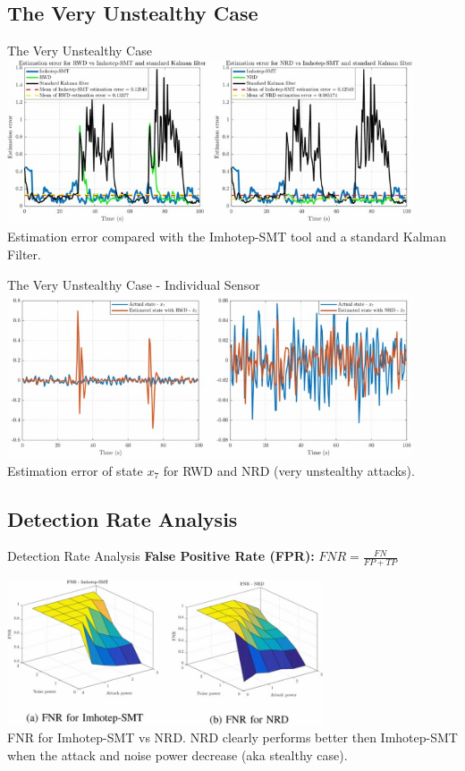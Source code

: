 \documentclass[aspectratio=169]{beamer}
\begin{document}
\subsection{The Very Unstealthy Case}
\begin{frame}{The Very Unstealthy Case}
	\centering
	\includegraphics[width=0.9\textwidth]{Images/Sim_Error_Comparison_VeryUnstealthy}\\
	Estimation error compared with the {Imhotep-SMT tool \cite{Imhotep_SMT}} and a standard Kalman Filter.
\end{frame}

\begin{frame}{The Very Unstealthy Case - Individual Sensor}
	\centering
	\includegraphics[width=0.9\textwidth]{Images/Sim_StateEstimation_VeryUnstealthy}\\
	
	Estimation error of state $x_7$ for RWD and NRD (very unstealthy attacks).
\end{frame}

\subsection{Detection Rate Analysis}
\begin{frame}{Detection Rate Analysis}
	\textbf{False Positive Rate (FPR):} $FNR = \frac{FN}{FP + TP}$
	
	\centering
	\includegraphics[width=0.7\textwidth]{Images/Sim_FNR_SMPvsNRD}\\
	FNR for Imhotep-SMT vs NRD. NRD clearly performs better then Imhotep-SMT when the attack and noise power decrease (aka stealthy case).

\end{frame}
\end{document}
